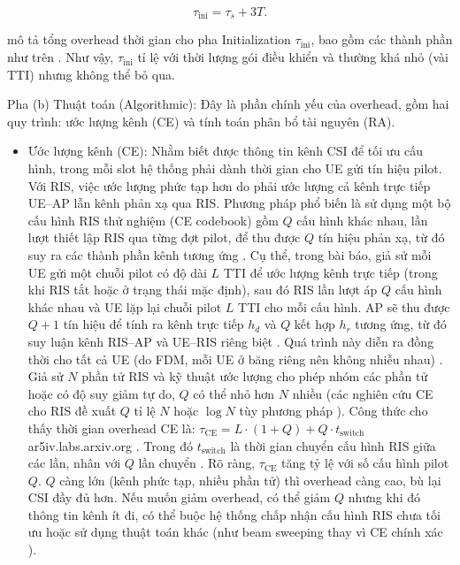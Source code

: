 \begin{equation}\label{eq:tau_ini}
\tau_{\mathrm{ini}} = \tau_{s} + 3T.
\end{equation}

mô tả tổng overhead thời gian cho pha Initialization $\tau_\text{ini}$, bao gồm các thành phần như trên
. Như vậy, $\tau_\text{ini}$ tỉ lệ với thời lượng gói điều khiển và thường khá nhỏ (vài TTI) nhưng không thể bỏ qua.


Pha (b) Thuật toán (Algorithmic): Đây là phần chính yếu của overhead, gồm hai quy trình: ước lượng kênh (CE) và tính toán phân bổ tài nguyên (RA).
\begin{itemize}
    \item Ước lượng kênh (CE): Nhằm biết được thông tin kênh CSI để tối ưu cấu hình, trong mỗi slot hệ thống phải dành thời gian cho UE gửi tín hiệu pilot. Với RIS, việc ước lượng phức tạp hơn do phải ước lượng cả kênh trực tiếp UE–AP lẫn kênh phản xạ qua RIS. Phương pháp phổ biến là sử dụng một bộ cấu hình RIS thử nghiệm (CE codebook) gồm $Q$ cấu hình khác nhau, lần lượt thiết lập RIS qua từng đợt pilot, để thu được $Q$ tín hiệu phản xạ, từ đó suy ra các thành phần kênh tương ứng
\cite{ris_latency}
. Cụ thể, trong bài báo, giả sử mỗi UE gửi một chuỗi pilot có độ dài $L$ TTI để ước lượng kênh trực tiếp (trong khi RIS tắt hoặc ở trạng thái mặc định), sau đó RIS lần lượt áp $Q$ cấu hình khác nhau và UE lặp lại chuỗi pilot $L$ TTI cho mỗi cấu hình. AP sẽ thu được $Q+1$ tín hiệu để tính ra kênh trực tiếp $h_{d}$ và $Q$ kết hợp $h_r$ tương ứng, từ đó suy luận kênh RIS–AP và UE–RIS riêng biệt
. Quá trình này diễn ra đồng thời cho tất cả UE (do FDM, mỗi UE ở băng riêng nên không nhiễu nhau)
. Giả sử $N$ phần tử RIS và kỹ thuật ước lượng cho phép nhóm các phần tử hoặc có độ suy giảm tự do, $Q$ có thể nhỏ hơn $N$ nhiều (các nghiên cứu CE cho RIS đề xuất $Q$ tỉ lệ $N$ hoặc $\log N$ tùy phương pháp
). Công thức cho thấy thời gian overhead CE là: $\tau_\text{CE} = L \cdot (1 + Q) + Q \cdot t_\text{switch}$
ar5iv.labs.arxiv.org
. Trong đó $t_\text{switch}$ là thời gian chuyển cấu hình RIS giữa các lần, nhân với $Q$ lần chuyển
. Rõ ràng, $\tau_\text{CE}$ tăng tỷ lệ với số cấu hình pilot $Q$. $Q$ càng lớn (kênh phức tạp, nhiều phần tử) thì overhead càng cao, bù lại CSI đầy đủ hơn. Nếu muốn giảm overhead, có thể giảm $Q$ nhưng khi đó thông tin kênh ít đi, có thể buộc hệ thống chấp nhận cấu hình RIS chưa tối ưu hoặc sử dụng thuật toán khác (như beam sweeping thay vì CE chính xác
).

\end{itemize}

